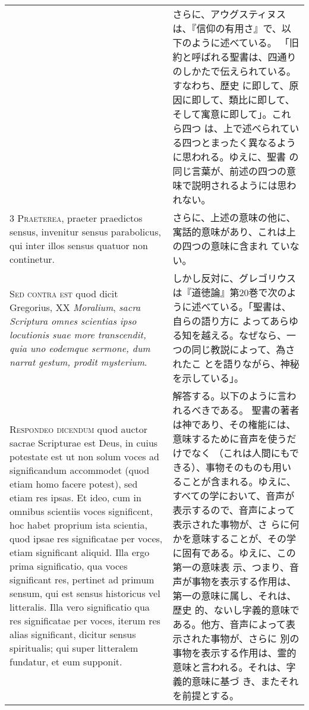 \documentclass[10pt]{jsarticle} %
\begin{document}
\begin{longtable}{p{21em}p{21em}}
&

さらに、アウグスティヌスは、『信仰の有用さ』で、以下のように述べている。
 「旧約と呼ばれる聖書は、四通りのしかたで伝えられている。すなわち、歴史
 に即して、原因に即して、類比に即して、そして寓意に即して」。これら四つ
 は、上で述べられている四つとまったく異なるように思われる。ゆえに、聖書
 の同じ言葉が、前述の四つの意味で説明されるようには思われない。


\\


{\scshape 3 Praeterea}, praeter praedictos sensus,
invenitur sensus parabolicus, qui inter illos sensus quatuor non
continetur.


&


さらに、上述の意味の他に、寓話的意味があり、これは上の四つの意味に含まれ
 ていない。

\\


{\scshape Sed contra est} quod dicit Gregorius, XX
{\itshape Moralium}, {\itshape sacra Scriptura omnes scientias ipso locutionis suae more
transcendit, quia uno eodemque sermone, dum narrat gestum, prodit
mysterium}.


&

しかし反対に、グレゴリウスは『道徳論』第20巻で次のように述べている。「聖書は、自らの語り方に
 よってあらゆる知を越える。なぜなら、一つの同じ教説によって、為されたこ
 とを語りながら、神秘を示している」。


\\


{\scshape Respondeo dicendum} quod auctor sacrae
Scripturae est Deus, in cuius potestate est ut non solum voces ad
significandum accommodet (quod etiam homo facere potest), sed etiam res
ipsas. Et ideo, cum in omnibus scientiis voces significent, hoc habet
proprium ista scientia, quod ipsae res significatae per voces, etiam
significant aliquid. Illa ergo prima significatio, qua voces significant
res, pertinet ad primum sensum, qui est sensus historicus vel
litteralis. Illa vero significatio qua res significatae per voces,
iterum res alias significant, dicitur sensus spiritualis; qui super
litteralem fundatur, et eum supponit. 



&

解答する。以下のように言われるべきである。
聖書の著者は神であり、その権能には、意味するために音声を使うだけでなく
 （これは人間にもできる）、事物そのものも用いることが含まれる。ゆえに、
すべての学において、音声が表示するので、音声によって表示された事物が、さ
 らに何かを意味することが、その学に固有である。ゆえに、この第一の意味表
 示、つまり、音声が事物を表示する作用は、第一の意味に属し、それは、歴史
 的、ないし字義的意味である。他方、音声によって表示された事物が、さらに
 別の事物を表示する作用は、霊的意味と言われる。それは、字義的意味に基づ
 き、またそれを前提とする。





\end{longtable}
\end{document}
